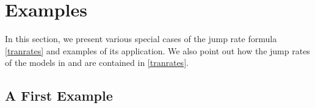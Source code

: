 \documentclass[12pt]{article}
\newcommand{\1}{\mathbf{1}} %
\newcommand{\generator}{\mathscr{L}} %
\newcommand{\inter}{{I}} %
\begin{document}
%





\section{Examples}
\label{sec:example}

In this section, we present various special cases of the jump rate
formula \eqref{tranrates} and examples of its application. We also
point out how the jump rates of the models in \cite{crea1} and
\cite{BellBeables} are contained in \eqref{tranrates}.

\subsection{A First Example}\label{sec:ex1}
\end{document}
